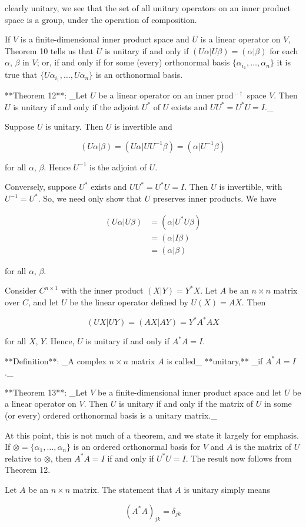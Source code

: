 clearly unitary, we see that the set of all unitary operators on an inner product space is a group, under the operation of composition.

If \(V\) is a finite-dimensional inner product space and \(U\) is a linear operator on \(V\), Theorem 10 tells us that \(U\) is unitary if and only if \((U\alpha|U\beta)=(\alpha|\beta)\) for each \(\alpha\), \(\beta\) in \(V\); or, if and only if for some (every) orthonormal basis \(\{\alpha_{i_{1}},\ldots,\alpha_{n}\}\) it is true that \(\{U\alpha_{i_{1}},\ldots,U\alpha_{n}\}\) is an orthonormal basis.

**Theorem 12**: _Let \(U\) be a linear operator on an inner prod\({}^{\cdots\dagger}\) space \(V\). Then \(U\) is unitary if and only if the adjoint \(U^{*}\) of \(U\) exists and \(UU^{*}=U^{*}U=I\)._

Suppose \(U\) is unitary. Then \(U\) is invertible and

\[(U\alpha|\beta)=(U\alpha|UU^{-1}\beta)=(\alpha|U^{-1}\beta)\]

for all \(\alpha\), \(\beta\). Hence \(U^{-1}\) is the adjoint of \(U\).

Conversely, suppose \(U^{*}\) exists and \(UU^{*}=U^{*}U=I\). Then \(U\) is invertible, with \(U^{-1}=U^{*}\). So, we need only show that \(U\) preserves inner products. We have

\[\begin{array}{rl}(U\alpha|U\beta)&=(\alpha|U^{*}U\beta)\\ &=(\alpha|I\beta)\\ &=(\alpha|\beta)\end{array}\]

for all \(\alpha\), \(\beta\).

Consider \(C^{n\times 1}\) with the inner product \((X|Y)=Y^{*}X\). Let \(A\) be an \(n\times n\) matrix over \(C\), and let \(U\) be the linear operator defined by \(U(X)=AX\). Then

\[(UX|UY)=(AX|AY)=Y^{*}A^{*}AX\]

for all \(X\), \(Y\). Hence, \(U\) is unitary if and only if \(A^{*}A=I\).

**Definition**: _A complex \(n\times n\) matrix \(A\) is called_ **unitary,** _if \(A^{*}A=I\)._

**Theorem 13**: _Let \(V\) be a finite-dimensional inner product space and let \(U\) be a linear operator on \(V\). Then \(U\) is unitary if and only if the matrix of \(U\) in some (or every) ordered orthonormal basis is a unitary matrix._

At this point, this is not much of a theorem, and we state it largely for emphasis. If \(\otimes=\{\alpha_{1},\ldots,\alpha_{n}\}\) is an ordered orthonormal basis for \(V\) and \(A\) is the matrix of \(U\) relative to \(\otimes\), then \(A^{*}A=I\) if and only if \(U^{*}U=I\). The result now follows from Theorem 12.

Let \(A\) be an \(n\times n\) matrix. The statement that \(A\) is unitary simply means

\[(A^{*}A)_{jk}=\delta_{jk}\] 